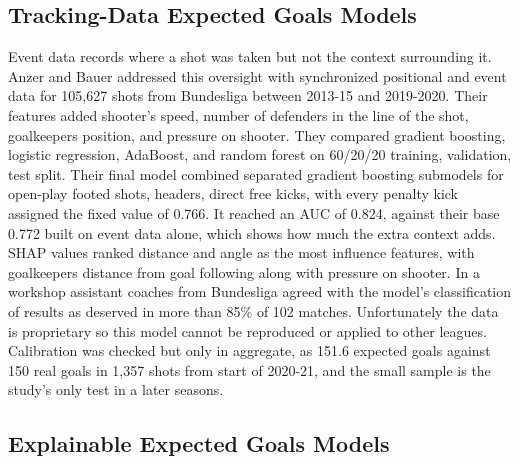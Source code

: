 \documentclass[conference]{IEEEtran}
\begin{document}
\subsection{Tracking-Data Expected Goals Models}

Event data records where a shot was taken but not the context surrounding it. Anzer and Bauer \cite{cavus2022} addressed this oversight with synchronized positional and event data for 105,627 shots from Bundesliga between 2013-15 and 2019-2020. Their features added shooter's speed, number of defenders in the line of the shot, goalkeepers position, and pressure on shooter. They compared gradient boosting, logistic regression, AdaBoost, and random forest on 60/20/20 training, validation, test split. Their final model combined separated gradient boosting submodels for open-play footed shots, headers, direct free kicks, with every penalty kick assigned the fixed value of 0.766. It reached an AUC of 0.824, against their base 0.772 built on event data alone, which shows how much the extra context adds. SHAP values ranked distance and angle as the most influence features, with goalkeepers distance from goal following along with pressure on shooter. In a workshop assistant coaches from Bundesliga agreed with the model's classification of results as deserved in more than 85\% of 102 matches. Unfortunately the data is proprietary so this model cannot be reproduced or applied to other leagues. Calibration was checked but only in aggregate, as 151.6 expected goals against 150 real goals in 1,357 shots from start of 2020-21, and the small sample is the study's only test in a later seasons.

\subsection{Explainable Expected Goals Models}
\end{document}
